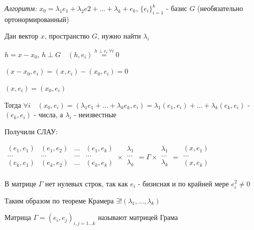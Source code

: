 \documentclass[12pt]{article}
\begin{document}
    \vspace{5mm}

    \textit{Алгоритм:} $x_0 = \lambda_1 e_1 + \lambda_2 e2 + \dots + \lambda_k + e_k$, $\{e_i\}^k_{i=1}$ - базис $G$ (необязательно ортонормированный)

    Дан вектор $x$, пространство $G$, нужно найти $\lambda_i$

    $h = x - x_0$, $h \perp G \quad  (h, e_i) \stackrel{h \perp e_i \ \forall i}{=} 0$

    $(x - x_0, e_i) = (x, e_i) - (x_0, e_i) = 0$

    $(x, e_i) = (x_0, e_i)$

    Тогда $\forall i \quad (x_0, e_i) = (\lambda_1 e_1 + \dots + \lambda_k e_k, e_i) = \lambda_1 (e_1, e_i) + \dots + \lambda_k (e_k, e_i)$ - $(e_k, e_i)$ - числа, а $\lambda_i$ - неизвестные

    Получили СЛАУ:

    $\begin{array}{|cccc|}
    (e_1, e_1) & (e_1, e_2) & \ldots & (e_1, e_k)\\
    \ldots & \ldots & \ldots & \ldots\\
    (e_k, e_1) & (e_k, e_2) & \ldots & (e_k, e_k)\\
    \end{array} \times \begin{array}{|c|}
    \lambda_1\\
    \ldots\\
    \lambda_k \\
    \end{array} = \Gamma \times \begin{array}{|c|}
    \lambda_1\\
    \ldots\\
    \lambda_k \\
    \end{array} = \begin{array}{|c|}
    (x,e_1)\\
    \ldots\\
    (x,e_k) \\
    \end{array}$

    \Nota В матрице $\Gamma$ нет нулевых строк, так как $e_i$ - бизисная и по крайней мере $e_i^2 \neq 0$

    Таким образом по теореме Крамера $\exists! (\lambda_1, \dots, \lambda_k)$

    \Def Матрица $\Gamma = {(e_i, e_j)}_{i, j = 1\dots k}$ называют матрицей Грама
\end{document}
